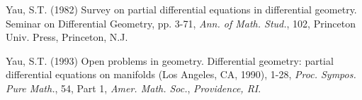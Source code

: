 \begin{thebibliography}{99}
	
	
	  Yau, S.T. (1982) Survey on partial differential equations in differential geometry. Seminar
	on Differential Geometry, pp. 3-71, \textit{Ann. of Math. Stud.}, 102, Princeton Univ. Press,
	Princeton, N.J.
	
	 Yau, S.T. (1993) Open problems in geometry. Differential geometry: partial differential equations
	on manifolds (Los Angeles, CA, 1990), 1-28, \textit{Proc. Sympos. Pure Math.}, 54,
	Part 1, \textit{Amer. Math. Soc.}, \textit{Providence, RI}.
	
	
	
	
	
	
	

\end{thebibliography} 
